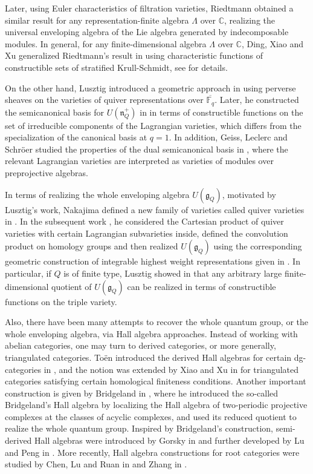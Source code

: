 \documentclass[12pt]{amsart}
\theoremstyle{definition}
\numberwithin{equation}{section}
\begin{document}
Later, using Euler characteristics of filtration varieties, Riedtmann \cite{Riedtmann94} obtained a similar result for any representation-finite algebra $ \Lambda $ over $ \mathbb{C} $, realizing the universal enveloping algebra of the Lie algebra generated by indecomposable modules. 
In general, for any finite-dimensional algebra $  \Lambda $ over $ \mathbb{C} $, Ding, Xiao and Xu generalized Riedtmann's result in \cite{DXX10} using characteristic functions of constructible sets of stratified Krull-Schmidt, see \cite[Section 3]{DXX10} for details. 

On the other hand, Lusztig introduced a geometric approach in \cite{Lusztig90canonical,Lusztig91} using perverse sheaves on the varieties of quiver representations over $ \overline{\mathbb{F}_q} $. 
Later, he constructed the semicanonical basis for $ U(\mathfrak{n}_Q^+) $ in \cite{Lusztig00semicanonical} in terms of constructible functions on the set of irreducible components of the Lagrangian varieties, which differs from the specialization of the canonical basis at $ q=1 $. 
In addition, Geiss, Leclerc and Schröer studied the properties of the dual semicanonical basis in \cite{GLS05,GLS07}, where the relevant Lagrangian varieties are interpreted as varieties of modules over preprojective algebras. 

In terms of realizing the whole enveloping algebra $ U(\mathfrak{g}_Q) $, motivated by Lusztig's work, Nakajima defined a new family of varieties called quiver varieties in \cite{Nakajima94}. 
In the subsequent work \cite{Nakajima98}, he considered the Cartesian product of quiver varieties with certain Lagrangian subvarieties inside, defined the convolution product on homology groups and then realized $ U(\mathfrak{g}_Q) $ using the corresponding geometric construction of integrable highest weight representations given in \cite{Nakajima94}. 
In particular, if $ Q $ is of finite type, Lusztig showed in \cite{Lusztig03} that any arbitrary large finite-dimensional quotient of $ U(\mathfrak{g}_Q) $ can be realized in terms of constructible functions on the triple variety. 

Also, there have been many attempts to recover the whole quantum group, or the whole enveloping algebra, via Hall algebra approaches. 
Instead of working with abelian categories, one may turn to derived categories, or more generally, triangulated categories. 
Toën introduced the derived Hall algebras for certain dg-categories in \cite{Toen06}, and the notion was extended by Xiao and Xu in \cite{XX08} for triangulated categories satisfying certain homological finiteness conditions. 
Another important construction is given by Bridgeland in \cite{Bridgeland13}, where he introduced the so-called Bridgeland's Hall algebra by localizing the Hall algebra of two-periodic projective complexes at the classes of acyclic complexes, and used its reduced quotient to realize the whole quantum group. 
Inspired by Bridgeland's construction, semi-derived Hall algebras were introduced by Gorsky in \cite{Gorsky13,Gorsky18} and further developed by Lu and Peng in \cite{LP21}. 
More recently, Hall algebra constructions for root categories were studied by Chen, Lu and Ruan in \cite{CLR25} and Zhang in \cite{Zh25}. 
\end{document}
